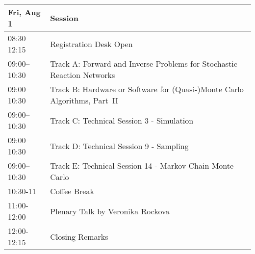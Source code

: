 \begin{table}
{\footnotesize
\begin{tabularx}{\textwidth}{>{\hsize=0.32\hsize}X|>{\hsize=1.7\hsize}X}
\hline
\textbf{Fri, Aug 1} & \textbf{Session} \\
\hline
\cellcolor{\EmptyColor}08:30–12:15 & \cellcolor{\EmptyColor}Registration Desk Open \\
\cellcolor{\SessionTitleColor}09:00–10:30 & \cellcolor{\SessionTitleColor}Track A: Forward and Inverse Problems for Stochastic Reaction Networks \\
\cellcolor{\SessionTitleColor}09:00–10:30 & \cellcolor{\SessionTitleColor}Track B: Hardware or Software for (Quasi-)Monte Carlo Algorithms, Part~II \\
\cellcolor{\SessionLightColor}09:00–10:30 & \cellcolor{\SessionLightColor}Track C: Technical Session 3 - Simulation \\
\cellcolor{\SessionLightColor}09:00–10:30 & \cellcolor{\SessionLightColor}Track D: Technical Session 9 - Sampling \\
\cellcolor{\SessionLightColor}09:00–10:30 & \cellcolor{\SessionLightColor}Track E: Technical Session 14 - Markov Chain Monte Carlo \\
\cellcolor{\EmptyColor}10:30-11 & \cellcolor{\EmptyColor}Coffee Break \\
\cellcolor{\PlenaryColor}11:00-12:00 & \cellcolor{\PlenaryColor}Plenary Talk by Veronika Rockova \\
\cellcolor{\PlenaryColor}12:00-12:15 & \cellcolor{\PlenaryColor}Closing Remarks \\
\hline
\end{tabularx}
}
\end{table}

